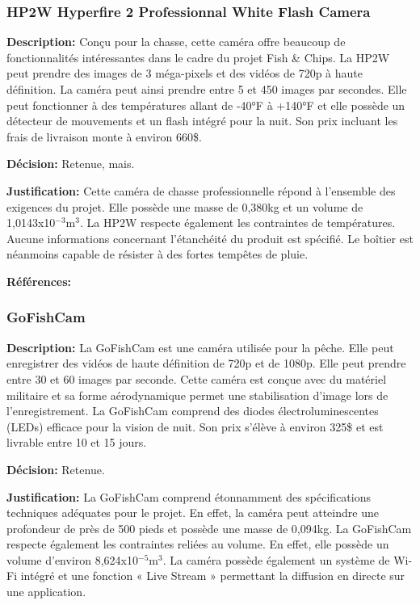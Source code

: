 \subsubsection{HP2W Hyperfire 2 Professionnal White Flash Camera}
\label{subsubsectionHyperfire}

\textbf{Description:} Conçu pour la chasse, cette caméra offre beaucoup de fonctionnalités intéressantes dans le cadre du projet Fish \& Chips. La HP2W peut prendre des images de 3 méga-pixels et des vidéos de 720p à haute définition. La caméra peut ainsi prendre entre 5 et 450 images par secondes. Elle peut fonctionner à des températures allant de -40°F à +140°F et elle possède un détecteur de mouvements et un flash intégré pour la nuit. Son prix incluant les frais de livraison monte à environ 660\$. \vspace{5mm}

\textbf{Décision:} Retenue, mais. \vspace{5mm}

\textbf{Justification:} Cette caméra de chasse professionnelle répond à l'ensemble des exigences du projet. Elle possède une masse de 0,380kg et un volume de 1,0143x10$^{-3}$m$^3$. La HP2W respecte également les contraintes de températures. Aucune informations concernant l'étanchéité du produit est spécifié. Le boîtier est néanmoins capable de résister à des fortes tempêtes de pluie. \vspace{5mm}

\textbf{Références:} \cite{HP2W}


\subsubsection{GoFishCam}

\textbf{Description:} La GoFishCam est une caméra utilisée pour la pêche. Elle peut enregistrer des vidéos de haute définition de 720p et de 1080p. Elle peut prendre entre 30 et 60 images par seconde. Cette caméra est conçue avec du matériel militaire et sa forme aérodynamique permet une stabilisation d'image lors de l'enregistrement. La GoFishCam comprend des diodes électroluminescentes (LEDs) efficace pour la vision de nuit. Son prix s'élève à environ 325\$ et est livrable entre 10 et 15 jours. \vspace{5mm}

\textbf{Décision:} Retenue. \vspace{5mm}

\textbf{Justification:} La GoFishCam comprend étonnamment des spécifications techniques adéquates pour le projet. En effet, la caméra peut atteindre une profondeur de près de 500 pieds et possède une masse de 0,094kg. La GoFishCam respecte également les contraintes reliées au volume. En effet, elle possède un volume d'environ 8,624x10$^{-5}$m$^3$. La caméra possède également un système de Wi-Fi intégré et une fonction « Live Stream » permettant la diffusion en directe sur une application. \vspace{5mm}

